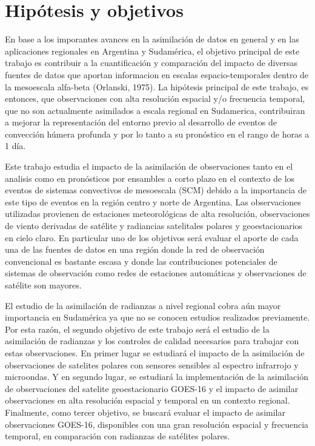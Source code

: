 \documentclass[12pt,oneside,a4paper]{reedthesis}
\begin{document}
\hypertarget{hipuxf3tesis-y-objetivos}{%
\section{Hipótesis y objetivos}\label{hipuxf3tesis-y-objetivos}}

En base a los imporantes avances en la asimilación de datos en general y en las aplicaciones regionales en Argentina y Sudamérica, el objetivo principal de este trabajo es contribuir a la cuantificación y comparación del impacto de diversas fuentes de datos que aportan informacion en escalas espacio-temporales dentro de la mesoescala alfa-beta (Orlanski, 1975). La hipótesis principal de este trabajo, es entonces, que observaciones con alta resolución espacial y/o frecuencia temporal, que no son actualmente asimilados a escala regional en Sudamerica, contribuiran a mejorar la representación del entorno previo al desarrollo de eventos de convección húmera profunda y por lo tanto a su pronóstico en el rango de horas a 1 día.

Este trabajo estudia el impacto de la asimilación de observaciones tanto en el analisis como en pronósticos por ensambles a corto plazo en el contexto de los eventos de sistemas convectivos de mesoescala (SCM) debido a la importancia de este tipo de eventos en la región centro y norte de Argentina. Las observaciones utilizadas provienen de estaciones meteorológicas de alta resolución, observaciones de viento derivadas de satélite y radiancias satelitales polares y geoestacionarios en cielo claro. En particular uno de los objetivos será evaluar el aporte de cada una de las fuentes de datos en una región donde la red de observación convencional es bastante escasa y donde las contribuciones potenciales de sistemas de observación como redes de estaciones automáticas y observaciones de satélite son mayores.

El estudio de la asimilación de radianzas a nivel regional cobra aún mayor importancia en Sudamérica ya que no se conocen estudios realizados previamente. Por esta razón, el segundo objetivo de este trabajo será el estudio de la asimilación de radianzas y los controles de calidad necesarios para trabajar con estas observaciones. En primer lugar se estudiará el impacto de la asimilación de observaciones de satelites polares con sensores sensibles al espectro infrarrojo y microondas. Y en segundo lugar, se estudiará la implementación de la asimilación de observaciones del satelite geoestacionario GOES-16 y el impacto de asimilar observaciones en alta resolución espacial y temporal en un contexto regional. Finalmente, como tercer objetivo, se buscará evaluar el impacto de asimilar observaciones GOES-16, disponibles con una gran resolución espacial y frecuencia temporal, en comparación con radianzas de satélites polares.
\end{document}
